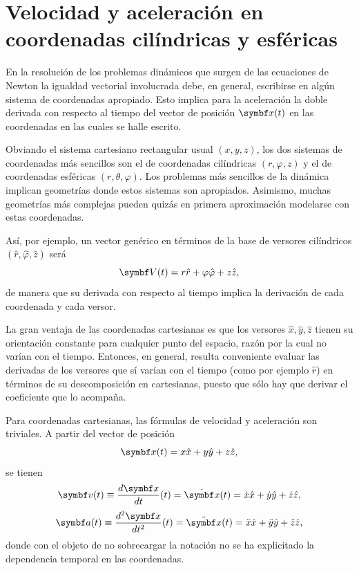 \documentclass[10pt,oneside]{CBFT_book}
\begin{document}
\section{Velocidad y aceleración en coordenadas cilíndricas y esféricas}

En la resolución de los problemas dinámicos que surgen de las ecuaciones de Newton la igualdad vectorial involucrada debe,
en general, escribirse en algún sistema de coordenadas apropiado. 
Esto implica para la aceleración la doble derivada con respecto al tiempo del vector de posición $ \vb{x}(t) $ en las
coordenadas en las cuales se halle escrito. 

Obviando el sistema cartesiano rectangular usual $(x,y,z)$, los dos sistemas de coordenadas más sencillos son el de
coordenadas cilíndricas $(r,\varphi,z)$ y el de coordenadas esféricas $(r,\theta,\varphi)$. Los problemas más sencillos
de la dinámica implican geometrías donde estos sistemas son apropiados. Asimismo, muchas geometrías más complejas pueden
quizás en primera aproximación modelarse con estas coordenadas.

Así, por ejemplo, un vector genérico en términos de la base de versores cilíndricos $(\hat{r},\hat{\varphi},\hat{z})$ será
\[
	\vb{V}(t) = r \hat{r} + \varphi \hat{\varphi} + z \hat{z},
\]
de manera que su derivada con respecto al tiempo implica la derivación de cada coordenada y cada versor.

La gran ventaja de las coordenadas cartesianas es que los versores $ \hat{ x }, \hat{ y }, \hat{ z }$ tienen su orientación
constante para cualquier punto del espacio, razón por la cual no varían con el tiempo. Entonces, en general, resulta 
conveniente evaluar las derivadas de los versores que sí varían con el tiempo (como por ejemplo $\hat{r}$) en términos de
su descomposición en cartesianas, puesto que sólo hay que derivar el coeficiente que lo acompaña.

Para coordenadas cartesianas, las fórmulas de velocidad y aceleración son triviales. A partir del vector de posición
\[
	\vb{x}(t) = x \hat{x} + y \hat{y}  + z\hat{z},
\]
se tienen 
\[
	\vb{v}(t) \equiv \dtot{\vb{x}}{t}(t) = \dot{\vb{x}}(t) = \dot{x} \hat{x} + \dot{y} \hat{y}  + \dot{z}\hat{z},
\]
\[
	\vb{a}(t) \equiv \dtot[2]{\vb{x}}{t}(t) = \ddot{\vb{x}}(t) = \ddot{x} \hat{x} + \ddot{y} \hat{y}  + \ddot{z} \hat{z},
\]
donde con el objeto de no sobrecargar la notación no se ha explicitado la dependencia temporal en las coordenadas.
\end{document}
